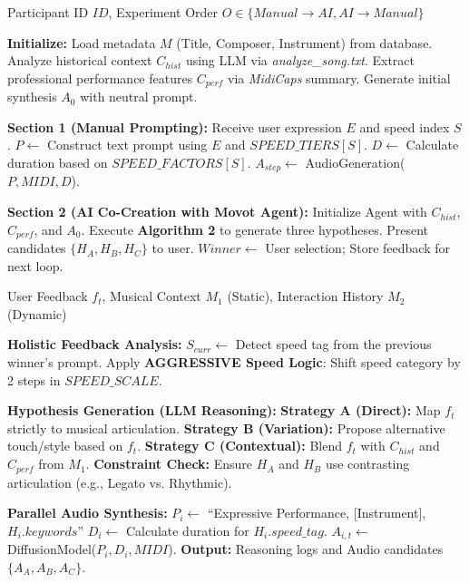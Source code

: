 \begin{algorithm}
\caption{提案システムの全体処理アルゴリズム}
\label{alg:overall}
\begin{algorithmic}[1]
\Require Participant ID $ID$, Experiment Order $O \in \{Manual \to AI, AI \to Manual\}$

\State \textbf{Initialize:}
\State Load metadata $M$ (Title, Composer, Instrument) from database.
\State Analyze historical context $C_{hist}$ using LLM via \textit{analyze\_song.txt}.
\State Extract professional performance features $C_{perf}$ via \textit{MidiCaps} summary.
\State Generate initial synthesis $A_0$ with neutral prompt.

\State \textbf{Section 1 (Manual Prompting):}
    \State Receive user expression $E$ and speed index $S$.
    \State $P \gets$ Construct text prompt using $E$ and $SPEED\_TIERS[S]$.
    \State $D \gets$ Calculate duration based on $SPEED\_FACTORS[S]$.
    \State $A_{step} \gets$ AudioGeneration($P, MIDI, D$).
\EndWhile

\State \textbf{Section 2 (AI Co-Creation with Movot Agent):}
\State Initialize Agent with $C_{hist}$, $C_{perf}$, and $A_0$.
    \State Execute \textbf{Algorithm 2} to generate three hypotheses.
    \State Present candidates $\{H_A, H_B, H_C\}$ to user.
    \State $Winner \gets$ User selection; Store feedback for next loop.
\EndWhile
\end{algorithmic}
\end{algorithm}

\begin{algorithm}
\caption{AIエージェントによる意図解釈と演奏生成のアルゴリズム}
\label{alg:agent}
\begin{algorithmic}[1]
\Require User Feedback $f_t$, Musical Context $M_1$ (Static), Interaction History $M_2$ (Dynamic)

\State \textbf{Holistic Feedback Analysis:}
\State $S_{curr} \gets$ Detect speed tag from the previous winner's prompt.
    \State Apply \textbf{AGGRESSIVE Speed Logic}: Shift speed category by 2 steps in $SPEED\_SCALE$.
\EndIf

\State \textbf{Hypothesis Generation (LLM Reasoning):}
\State \textbf{Strategy A (Direct):} Map $f_t$ strictly to musical articulation.
\State \textbf{Strategy B (Variation):} Propose alternative touch/style based on $f_t$.
\State \textbf{Strategy C (Contextual):} Blend $f_t$ with $C_{hist}$ and $C_{perf}$ from $M_1$.
\State \textbf{Constraint Check:} Ensure $H_A$ and $H_B$ use contrasting articulation (e.g., Legato vs. Rhythmic).

\State \textbf{Parallel Audio Synthesis:}
    \State $P_i \gets$ ``Expressive Performance, [Instrument], $H_i.keywords$''
    \State $D_i \gets$ Calculate duration for $H_i.speed\_tag$.
    \State $A_{i,t} \gets$ DiffusionModel($P_i, D_i, MIDI$).
\EndFor
\State \textbf{Output:} Reasoning logs and Audio candidates $\{A_A, A_B, A_C\}$.
\end{algorithmic}
\end{algorithm}



